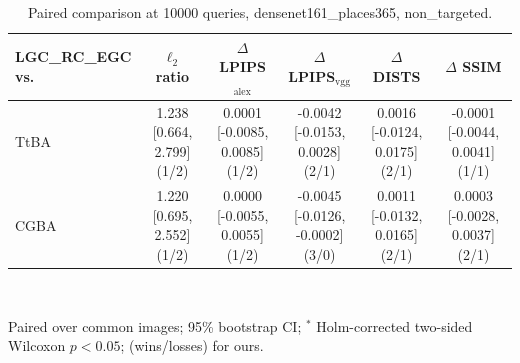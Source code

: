\begin{table}[t]
\centering\footnotesize
\caption{Paired comparison at 10000 queries, densenet161\_places365, non\_targeted.}
\begin{tabular}{lccccc}
\toprule
LGC\_RC\_EGC vs. & $\ell_2$ ratio & $\Delta$ LPIPS$_{\mathrm{alex}}$ & $\Delta$ LPIPS$_{\mathrm{vgg}}$ & $\Delta$ DISTS & $\Delta$ SSIM \\
\midrule
TtBA & 1.238 [0.664, 2.799] (1/2) & 0.0001 [-0.0085, 0.0085] (1/2) & -0.0042 [-0.0153, 0.0028] (2/1) & 0.0016 [-0.0124, 0.0175] (2/1) & -0.0001 [-0.0044, 0.0041] (1/1) \\
CGBA & 1.220 [0.695, 2.552] (1/2) & 0.0000 [-0.0055, 0.0055] (1/2) & -0.0045 [-0.0126, -0.0002] (3/0) & 0.0011 [-0.0132, 0.0165] (2/1) & 0.0003 [-0.0028, 0.0037] (2/1) \\
\bottomrule
\end{tabular}
\\[2pt]\parbox{\linewidth}{\scriptsize Paired over common images; 95\% bootstrap CI; $^{*}$ Holm-corrected two-sided Wilcoxon $p<0.05$; (wins/losses) for ours.}
\end{table}
